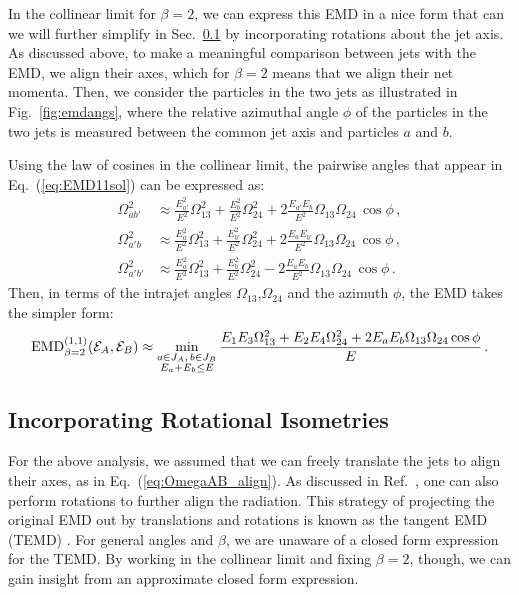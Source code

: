 \documentclass[letterpaper,11pt]{article}
\DeclareRobustCommand{\Sec}[1]{Sec.~\ref{#1}}
\DeclareRobustCommand{\Fig}[1]{Fig.~\ref{#1}}
\DeclareRobustCommand{\Eq}[1]{Eq.~(\ref{#1})}
\DeclareRobustCommand{\InRef}[1]{Ref.~\cite{#1}}
\begin{document}
In the collinear limit for $\beta = 2$, we can express this EMD in a nice form that can we will further simplify in \Sec{sec:tangentEMD} by incorporating rotations about the jet axis.
%
As discussed above, to make a meaningful comparison between jets with the EMD, we align their axes, which for $\beta = 2$ means that we align their net momenta.
%
Then, we consider the particles in the two jets as illustrated in \Fig{fig:emdangs}, where the relative azimuthal angle $\phi$ of the particles in the two jets is measured between the common jet axis and particles $a$ and $b$.


Using the law of cosines in the collinear limit, the pairwise angles that appear in \Eq{eq:EMD11sol} can be expressed as:
%
\begin{align}
\Omega^2_{ab'}&\approx \frac{E_{a'}^2}{E^2}\Omega_{13}^2+\frac{E_b^2}{E^2}\Omega_{24}^2+2\frac{E_{a'}E_b}{E^2}\Omega_{13}\Omega_{24}\,\cos\phi\,,\\
\Omega^2_{a'b}&\approx \frac{E_{a}^2}{E^2}\Omega_{13}^2+\frac{E_{b'}^2}{E^2}\Omega_{24}^2+2\frac{E_{a}E_{b'}}{E^2}\Omega_{13}\Omega_{24}\,\cos\phi\,,\\
\Omega^2_{a'b'}&\approx \frac{E_{a}^2}{E^2}\Omega_{13}^2+\frac{E_b^2}{E^2}\Omega_{24}^2-2\frac{E_{a}E_b}{E^2}\Omega_{13}\Omega_{24}\,\cos\phi\,.
\end{align}
%
Then, in terms of the intrajet angles $\Omega_{13}$,$\Omega_{24}$ and the azimuth $\phi$, the EMD takes the simpler form:
%
\begin{align}\label{eq:emdcollb2}
\text{EMD}^{(1,1)}_{\beta=2}({\cal E}_A,{\cal E}_B) \approx  \min_{\substack{a\in J_A,\,b\in J_B\\E_a+E_b\leq E}}\frac{E_1E_{3}\Omega_{13}^2+E_2E_{4}\Omega_{24}^2+2E_a E_b\Omega_{13}\Omega_{24}\cos\phi}{E}\,.
\end{align}

\subsection{Incorporating Rotational Isometries}
\label{sec:tangentEMD}


For the above analysis, we assumed that we can freely translate the jets to align their axes, as in \Eq{eq:OmegaAB_align}.
%
As discussed in \InRef{deOliveira:2015xxd}, one can also perform rotations to further align the radiation.
%
This strategy of projecting the original EMD out by translations and rotations is known as the tangent EMD (TEMD) \cite{10.1007/978-3-642-40020-9_43}.
%
For general angles and $\beta$, we are unaware of a closed form expression for the TEMD.
%
By working in the collinear limit and fixing $\beta = 2$, though, we can gain insight from an approximate closed form expression.
\end{document}

